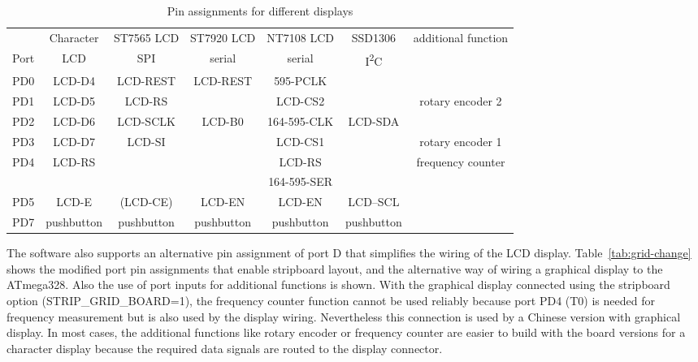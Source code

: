 \begin{table}[H] \small
  \begin{center}
    \begin{tabular}{| c || c | c | c | c | c | c |}
    \hline
           & Character     & ST7565 LCD & ST7920 LCD     & NT7108 LCD  & SSD1306     & additional function \\
      Port & LCD           &   SPI      & serial         & serial      &   I\textsuperscript{2}C      & \\
    \hline
    \hline
    PD0    &  LCD-D4       &  LCD-REST  & LCD-REST       & 595-PCLK        &            & \\
    \hline
    PD1    &  LCD-D5       &  LCD-RS    &                & LCD-CS2     &             & rotary encoder 2 \\
    \hline
    PD2    &  LCD-D6       &  LCD-SCLK  & LCD-B0         & 164-595-CLK &  LCD-SDA    & \\
    \hline
    PD3    &  LCD-D7       &  LCD-SI    &                & LCD-CS1     &             & rotary encoder 1 \\
    \hline
    PD4    &  LCD-RS       &            &                & LCD-RS      &             & frequency counter \\
           &               &            &                & 164-595-SER &             &                \\
    \hline
    PD5    &  LCD-E        & (LCD-CE)   & LCD-EN         & LCD-EN      &   LCD--SCL  & \\
    \hline
    PD7    &  pushbutton   & pushbutton & pushbutton     & pushbutton  & pushbutton  & \\
    \hline
    \end{tabular}
  \end{center}
  \caption{Pin assignments for different displays}
  \label{tab:display-con}
\end{table}


The software also supports an alternative pin assignment of port D that simplifies the wiring of the
LCD display. 
Table~\ref{tab:grid-change} shows the modified port pin assignments that enable stripboard layout, 
and the alternative way of wiring a graphical display to the ATmega328.
Also the use of port inputs for additional functions is shown.
With the graphical display connected using the stripboard option (STRIP\_GRID\_BOARD=1),
the frequency counter function cannot be used reliably because port PD4 (T0) is needed for
frequency measurement but is also used by the display wiring. 
Nevertheless this connection is used by a Chinese version with graphical display. 
In most cases, the additional functions like rotary encoder or frequency counter
are easier to build with the board versions for a character display
because the required data signals are routed to the display connector.




